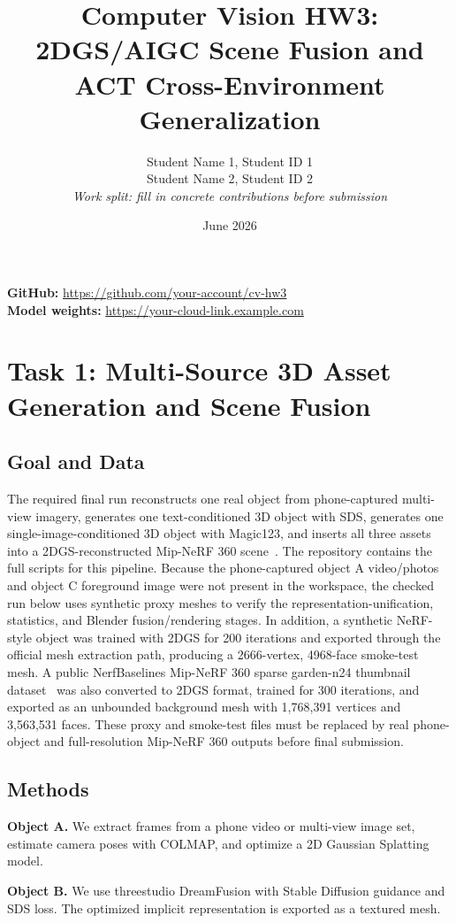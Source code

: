 \documentclass[10pt]{article}
\title{Computer Vision HW3: 2DGS/AIGC Scene Fusion and ACT Cross-Environment Generalization}
\author{
Student Name 1, Student ID 1 \\
Student Name 2, Student ID 2 \\
\textit{Work split: fill in concrete contributions before submission}
}
\date{June 2026}
\begin{document}
\maketitle

\textbf{GitHub:} \url{https://github.com/your-account/cv-hw3} \\
\textbf{Model weights:} \url{https://your-cloud-link.example.com}

\section{Task 1: Multi-Source 3D Asset Generation and Scene Fusion}

\subsection{Goal and Data}
The required final run reconstructs one real object from phone-captured multi-view imagery, generates one text-conditioned 3D object with SDS, generates one single-image-conditioned 3D object with Magic123, and inserts all three assets into a 2DGS-reconstructed Mip-NeRF 360 scene~\cite{barron2022mipnerf360,huang2024twodgs,qian2024magic123}. The repository contains the full scripts for this pipeline. Because the phone-captured object A video/photos and object C foreground image were not present in the workspace, the checked run below uses synthetic proxy meshes to verify the representation-unification, statistics, and Blender fusion/rendering stages. In addition, a synthetic NeRF-style object was trained with 2DGS for 200 iterations and exported through the official mesh extraction path, producing a 2666-vertex, 4968-face smoke-test mesh. A public NerfBaselines Mip-NeRF 360 sparse garden-n24 thumbnail dataset~\cite{nerfbaselines2024} was also converted to 2DGS format, trained for 300 iterations, and exported as an unbounded background mesh with 1,768,391 vertices and 3,563,531 faces. These proxy and smoke-test files must be replaced by real phone-object and full-resolution Mip-NeRF 360 outputs before final submission.

\subsection{Methods}
\textbf{Object A.} We extract frames from a phone video or multi-view image set, estimate camera poses with COLMAP, and optimize a 2D Gaussian Splatting model.

\textbf{Object B.} We use threestudio DreamFusion with Stable Diffusion guidance and SDS loss. The optimized implicit representation is exported as a textured mesh.
\end{document}
